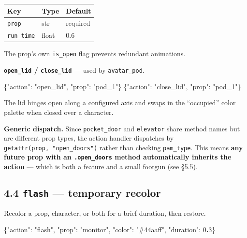 \documentclass[
  11pt,
]{book}
\newenvironment{Shaded}{}{}
\newcommand{\DataTypeTok}[1]{\textcolor[rgb]{0.56,0.13,0.00}{#1}}
\newcommand{\DecValTok}[1]{\textcolor[rgb]{0.25,0.63,0.44}{#1}}
\newcommand{\ErrorTok}[1]{\textcolor[rgb]{1.00,0.00,0.00}{\textbf{#1}}}
\newcommand{\FunctionTok}[1]{\textcolor[rgb]{0.02,0.16,0.49}{#1}}
\newcommand{\StringTok}[1]{\textcolor[rgb]{0.25,0.44,0.63}{#1}}
\begin{document}
\begin{longtable}[]{@{}lll@{}}
\toprule\noalign{}
Key & Type & Default \\
\midrule\noalign{}
\endhead
\bottomrule\noalign{}
\endlastfoot
\texttt{prop} & str & required \\
\texttt{run\_time} & float & 0.6 \\
\end{longtable}

The prop's own \texttt{is\_open} flag prevents redundant animations.

\textbf{\texttt{open\_lid} / \texttt{close\_lid}} --- used by
\texttt{avatar\_pod}.

\begin{Shaded}
\begin{Highlighting}[]
\FunctionTok{\{}\DataTypeTok{"action"}\FunctionTok{:} \StringTok{"open\_lid"}\FunctionTok{,} \DataTypeTok{"prop"}\FunctionTok{:} \StringTok{"pod\_1"}\FunctionTok{\}}
\FunctionTok{\{}\DataTypeTok{"action"}\FunctionTok{:} \StringTok{"close\_lid"}\FunctionTok{,} \DataTypeTok{"prop"}\FunctionTok{:} \StringTok{"pod\_1"}\FunctionTok{\}}
\end{Highlighting}
\end{Shaded}

The lid hinges open along a configured axis and swaps in the
``occupied'' color palette when closed over a character.

\textbf{Generic dispatch.} Since \texttt{pocket\_door} and
\texttt{elevator} share method names but are different prop types, the
action handler dispatches by \texttt{getattr(prop,\ "open\_doors")}
rather than checking \texttt{pam\_type}. This means \textbf{any future
prop with an \texttt{.open\_doors} method automatically inherits the
action} --- which is both a feature and a small footgun (see §5.5).

\subsection{\texorpdfstring{4.4 \texttt{flash} --- temporary
recolor}{4.4 flash --- temporary recolor}}\label{flash-temporary-recolor}

Recolor a prop, character, or both for a brief duration, then restore.

\begin{Shaded}
\begin{Highlighting}[]
\FunctionTok{\{}\DataTypeTok{"action"}\FunctionTok{:} \StringTok{"flash"}\FunctionTok{,} \DataTypeTok{"prop"}\FunctionTok{:} \StringTok{"monitor"}\FunctionTok{,}
 \DataTypeTok{"color"}\FunctionTok{:} \StringTok{"\#44aaff"}\FunctionTok{,} \DataTypeTok{"duration"}\FunctionTok{:} \DecValTok{0}\ErrorTok{.}\DecValTok{3}\FunctionTok{\}}
\end{Highlighting}
\end{Shaded}
\end{document}
